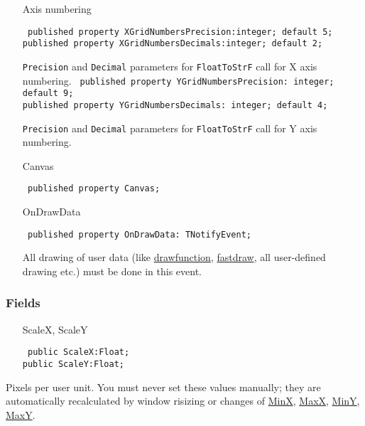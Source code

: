 \documentclass[12pt,a4paper,oneside]{report}
\newcommand{\declarationitem}[1]{{\addfontfeatures{FakeBold=1.3} #1}}
\newcommand{\code}[1]{\texttt{#1}}
\begin{document}
\begin{itemize}
\label{lmcoordsys.TCoordSys-XGridNumbersPrecision}
\item [\declarationitem{Axis numbering}]
\begin{flushleft}
\code{
published property XGridNumbersPrecision:integer; default 5;\\
published property XGridNumbersDecimals:integer; default 2;}
\end{flushleft}
\par\code{Precision} and \code{Decimal} parameters for \code{FloatToStrF} call for X axis numbering. \label{lmcoordsys.TCoordSys-XGridNumbersDecimals}
\label{lmcoordsys.TCoordSys-YGridNumbersPrecision}
\code{
published property YGridNumbersPrecision: integer; default 9;\\
published property YGridNumbersDecimals: integer; default 4;}
\par \code{Precision} and \code{Decimal} parameters for \code{FloatToStrF} call for Y axis  numbering. \label{lmcoordsys.TCoordSys-YGridNumbersDecimals}
\label{lmcoordsys.TCoordSys-Canvas}
\item[\declarationitem{Canvas}\hfill]
\begin{flushleft}
\code{
published property Canvas;}
\end{flushleft}
\label{lmcoordsys.TCoordSys-OnDrawData}
\item[\declarationitem{OnDrawData}\hfill]
\begin{flushleft}
\code{
published property OnDrawData: TNotifyEvent;}
\end{flushleft}
All drawing of user data (like \hyperref[lmcoordsys.TCoordSys-DrawFunc]{drawfunction}, \hyperref[lmcoordsys.TCoordSys-FastDraw]{fastdraw}, all user-defined drawing etc.) must be done in this event.\end{itemize}
\subsubsection{Fields}
\begin{itemize}\label{lmcoordsys.TCoordSys-ScaleX}
\item[\declarationitem{ScaleX, ScaleY}\hfill]
\begin{flushleft}
\code{
public ScaleX:Float;\\
public ScaleY:Float;}
\end{flushleft}
\end{itemize}
\par Pixels per user unit. You must never set these values manually; they are automatically recalculated by window risizing or changes of \hyperref[lmcoordsys.TCoordSys-MinX]{MinX}, \hyperref[lmcoordsys.TCoordSys-MinX]{MaxX}, \hyperref[lmcoordsys.TCoordSys-MinY]{MinY}, \hyperref[lmcoordsys.TCoordSys-MinY]{MaxY}. \label{lmcoordsys.TCoordSys-ScaleY}
\end{document}
